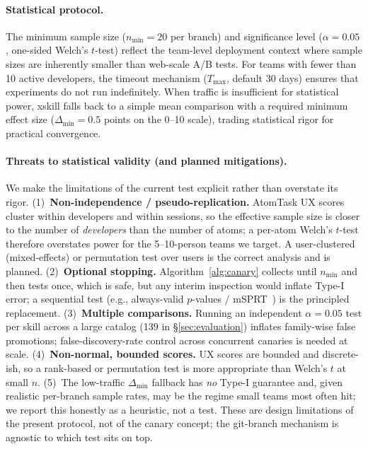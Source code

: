 \documentclass{article}
\begin{document}
\paragraph{Statistical protocol.} The minimum sample size ($n_{\min} = 20$ per branch) and significance level ($\alpha = 0.05$, one-sided Welch's $t$-test) reflect the team-level deployment context where sample sizes are inherently smaller than web-scale A/B tests. For teams with fewer than 10 active developers, the timeout mechanism ($T_{\max}$, default 30 days) ensures that experiments do not run indefinitely. When traffic is insufficient for statistical power, xskill falls back to a simple mean comparison with a required minimum effect size ($\Delta_{\min} = 0.5$ points on the 0--10 scale), trading statistical rigor for practical convergence.

\paragraph{Threats to statistical validity (and planned mitigations).} We make the limitations of the current test explicit rather than overstate its rigor. (1)~\textbf{Non-independence / pseudo-replication.} AtomTask UX scores cluster within developers and within sessions, so the effective sample size is closer to the number of \emph{developers} than the number of atoms; a per-atom Welch's $t$-test therefore overstates power for the 5--10-person teams we target. A user-clustered (mixed-effects) or permutation test over users is the correct analysis and is planned. (2)~\textbf{Optional stopping.} Algorithm~\ref{alg:canary} collects until $n_{\min}$ and then tests once, which is safe, but any interim inspection would inflate Type-I error; a sequential test (e.g., always-valid $p$-values / mSPRT~\citep{kohavi2020trustworthy}) is the principled replacement. (3)~\textbf{Multiple comparisons.} Running an independent $\alpha=0.05$ test per skill across a large catalog (139 in \S\ref{sec:evaluation}) inflates family-wise false promotions; false-discovery-rate control across concurrent canaries is needed at scale. (4)~\textbf{Non-normal, bounded scores.} UX scores are bounded and discrete-ish, so a rank-based or permutation test is more appropriate than Welch's $t$ at small $n$. (5)~The low-traffic $\Delta_{\min}$ fallback has \emph{no} Type-I guarantee and, given realistic per-branch sample rates, may be the regime small teams most often hit; we report this honestly as a heuristic, not a test. These are design limitations of the present protocol, not of the canary concept; the git-branch mechanism is agnostic to which test sits on top.
\end{document}

